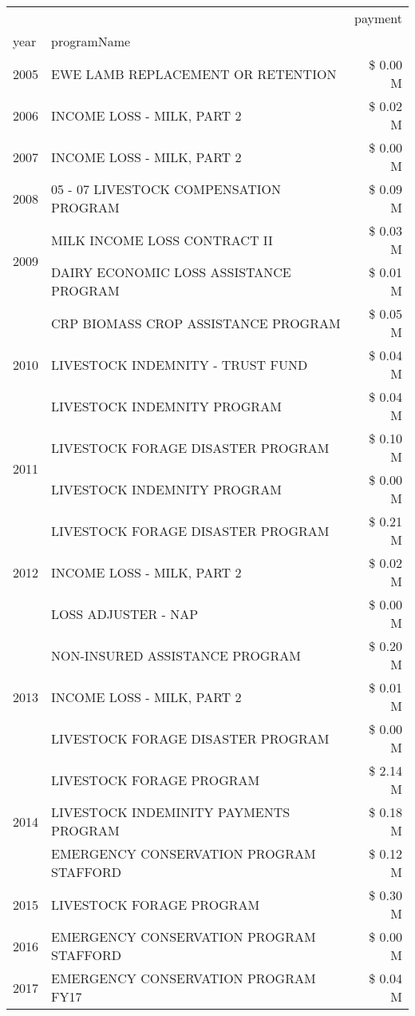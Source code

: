 \begin{tabular}{llr}
\toprule
 &  & payment \\
year & programName &  \\
\midrule
2005 & EWE LAMB REPLACEMENT OR RETENTION & \$ 0.00 M \\
\cline{1-3}
2006 & INCOME LOSS - MILK, PART 2 & \$ 0.02 M \\
\cline{1-3}
2007 & INCOME LOSS - MILK, PART 2 & \$ 0.00 M \\
\cline{1-3}
2008 & 05 - 07 LIVESTOCK COMPENSATION PROGRAM & \$ 0.09 M \\
\cline{1-3}
\multirow[t]{2}{*}{2009} & MILK INCOME LOSS CONTRACT II & \$ 0.03 M \\
 & DAIRY ECONOMIC LOSS ASSISTANCE PROGRAM & \$ 0.01 M \\
\cline{1-3}
\multirow[t]{3}{*}{2010} & CRP BIOMASS CROP ASSISTANCE PROGRAM & \$ 0.05 M \\
 & LIVESTOCK INDEMNITY - TRUST FUND & \$ 0.04 M \\
 & LIVESTOCK INDEMNITY PROGRAM & \$ 0.04 M \\
\cline{1-3}
\multirow[t]{2}{*}{2011} & LIVESTOCK FORAGE DISASTER PROGRAM & \$ 0.10 M \\
 & LIVESTOCK INDEMNITY PROGRAM & \$ 0.00 M \\
\cline{1-3}
\multirow[t]{3}{*}{2012} & LIVESTOCK FORAGE DISASTER PROGRAM & \$ 0.21 M \\
 & INCOME LOSS - MILK, PART 2 & \$ 0.02 M \\
 & LOSS ADJUSTER - NAP & \$ 0.00 M \\
\cline{1-3}
\multirow[t]{3}{*}{2013} & NON-INSURED ASSISTANCE PROGRAM & \$ 0.20 M \\
 & INCOME LOSS - MILK, PART 2 & \$ 0.01 M \\
 & LIVESTOCK FORAGE DISASTER PROGRAM & \$ 0.00 M \\
\cline{1-3}
\multirow[t]{3}{*}{2014} & LIVESTOCK FORAGE PROGRAM & \$ 2.14 M \\
 & LIVESTOCK INDEMINITY PAYMENTS PROGRAM & \$ 0.18 M \\
 & EMERGENCY CONSERVATION PROGRAM STAFFORD & \$ 0.12 M \\
\cline{1-3}
2015 & LIVESTOCK FORAGE PROGRAM & \$ 0.30 M \\
\cline{1-3}
2016 & EMERGENCY CONSERVATION PROGRAM STAFFORD & \$ 0.00 M \\
\cline{1-3}
\multirow[t]{2}{*}{2017} & EMERGENCY CONSERVATION PROGRAM FY17 & \$ 0.04 M \\

\end{tabular}
